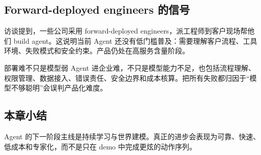 \subsection{Forward-deployed engineers 的信号}

访谈提到，一些公司采用 forward-deployed engineers，派工程师到客户现场帮他们 build agent。这说明当前 Agent 还没有低门槛普及：需要理解客户流程、工具环境、失败模式和安全约束。产品仍处在高服务含量阶段。

\begin{warningbox}{部署难不只是模型弱}
Agent 进企业难，不只是模型能力不足，也包括流程理解、权限管理、数据接入、错误责任、安全边界和成本核算。把所有失败都归因于“模型不够聪明”会误判产品化难度。
\end{warningbox}

\subsection{本章小结}

Agent 的下一阶段主线是持续学习与世界建模。真正的进步会表现为可靠、快速、低成本和专家化，而不是只在 demo 中完成更炫的动作序列。

